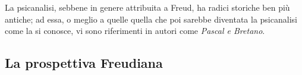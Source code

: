 \documentclass{subfiles}
\begin{document}
La psicanalisi, sebbene in genere attribuita a Freud, ha radici storiche ben più antiche;
ad essa, o meglio a quelle quella che poi sarebbe diventata la psicanalisi come la si conosce,
vi sono riferimenti in autori come \emph{Pascal \emph{e} Bretano}.

\subsection{La prospettiva Freudiana}

\end{document}
